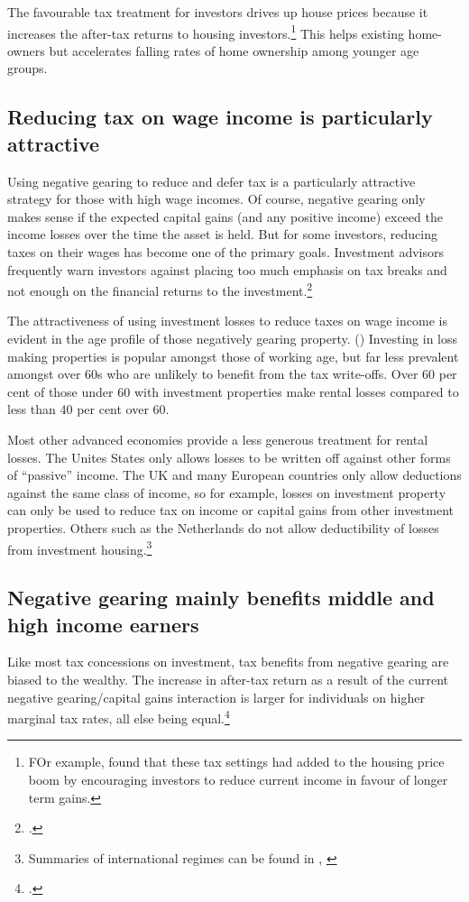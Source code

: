 \documentclass{grattan}\usepackage[]{graphicx}\usepackage[]{color}
\begin{document}
The favourable tax treatment for investors drives up house prices because it increases the after-tax returns to housing investors.\footnote{FOr example, \textcite{Commission2004} found that these tax settings had added to the housing price boom by encouraging investors to reduce current income in favour of longer term gains.} This helps existing home-owners but accelerates falling rates of home ownership among younger age groups.

\subsection{Reducing tax on wage income is particularly attractive}
Using negative gearing to reduce and defer tax is a particularly attractive strategy for those with high wage incomes. Of course, negative gearing only makes sense if the expected capital gains (and any positive income) exceed the income losses over the time the asset is held. But for some investors, reducing taxes on their wages has become one of the primary goals. Investment advisors frequently warn investors against placing too much emphasis on tax breaks and not enough on the financial returns to the investment.\footcite[See for example:]{Brown2012}

The attractiveness of using investment losses to reduce taxes on wage income is evident in the age profile of those negatively gearing property. () Investing in loss making properties is popular amongst those of working age, but far less prevalent amongst over 60s who are unlikely to benefit from the tax write-offs. Over 60 per cent of those under 60 with investment properties make rental losses compared to less than 40 per cent over 60. 



Most other advanced economies provide a less generous treatment for rental losses. The Unites States only allows losses to be written off against other forms of ``passive'' income. The UK and many European countries only allow deductions against the same class of income, so for example, losses on investment property can only be used to reduce tax on income or capital gains from other investment properties. Others such as the Netherlands do not allow deductibility of losses from investment housing.\footnote{Summaries of international regimes can be found in \textcite[p.~43]{RBA2014} \textcite[p.~86]{Commission2004}, \textcite[pp.~92-95]{ODonnell2005}}%

\subsection{Negative gearing mainly benefits middle and high income earners}
Like most tax concessions on investment, tax benefits from negative gearing are biased to the wealthy. The increase in after-tax return as a result of the current negative gearing/capital gains interaction is larger for individuals on higher marginal tax rates, all else being equal.\footcite{Inquiry2014}   
\end{document}
